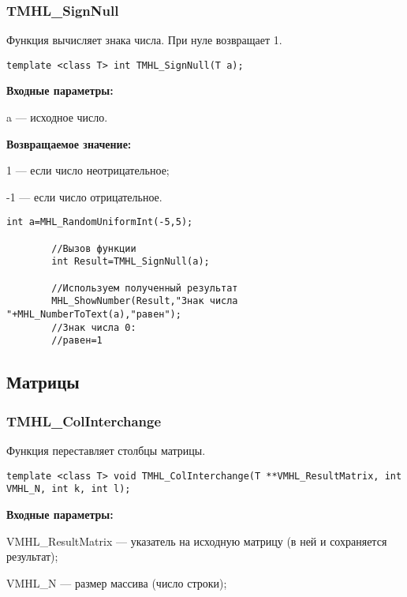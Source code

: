 \documentclass[a4paper,12pt]{article}
\begin{document}
\subsubsection{TMHL\_SignNull}\label{TMHL_SignNull}

Функция вычисляет знака числа. При нуле возвращает 1.


\begin{lstlisting}[label=code_syntax_TMHL_SignNull,caption=Синтаксис]
template <class T> int TMHL_SignNull(T a);
\end{lstlisting}

\textbf{Входные параметры:}

 a --- исходное число.

\textbf{Возвращаемое значение:}

 1 --- если число неотрицательное;
 
 -1 --- если число отрицательное.


\begin{lstlisting}[label=code_use_TMHL_SignNull,caption=Пример использования]
        int a=MHL_RandomUniformInt(-5,5);

        //Вызов функции
        int Result=TMHL_SignNull(a);

        //Используем полученный результат
        MHL_ShowNumber(Result,"Знак числа "+MHL_NumberToText(a),"равен");
        //Знак числа 0:
        //равен=1
\end{lstlisting}

\subsection{Матрицы}

\subsubsection{TMHL\_ColInterchange}\label{TMHL_ColInterchange}

Функция переставляет столбцы матрицы.


\begin{lstlisting}[label=code_syntax_TMHL_ColInterchange,caption=Синтаксис]
template <class T> void TMHL_ColInterchange(T **VMHL_ResultMatrix, int VMHL_N, int k, int l);
\end{lstlisting}

\textbf{Входные параметры:} 
 
VMHL\_ResultMatrix --- указатель на исходную матрицу (в ней и сохраняется результат);
 
VMHL\_N --- размер массива (число строки);
 
\end{document}

